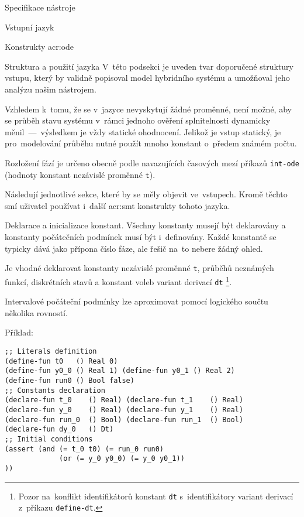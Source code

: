 \documentclass[thesis=M,czech]{FITthesis}[2012/06/26]
\newcommand{\acrlabel}[1]{acr:#1}
\newcommand{\acr}[1]{\acrshort{\acrlabel{#1}}}
\newcommand{\id}[1]{\texttt{#1}}
\begin{document}
\begin{section}{Specifikace nástroje}
\begin{subsection}{Vstupní jazyk}
\begin{subsubsection}{Konstrukty \acr{ode}}

\end{subsubsection} %


\begin{subsubsection}{Struktura a použití jazyka}
\label{sss:design:spec:ilang:struct}
V~této podsekci je uveden tvar doporučené struktury vstupu,
který by validně popisoval model hybridního systému
a umožňoval jeho analýzu našim nástrojem.

Vzhledem k~tomu, že se v~jazyce nevyskytují žádné proměnné,
není možné, aby se průběh stavu systému
v~rámci jednoho ověření splnitelnosti
dynamicky měnil~---~výsledkem je vždy statické ohodnocení.
Jelikož je vstup statický,
je pro~modelování průběhu nutné použít mnoho konstant
o~předem známém počtu.

Rozložení fází je určeno obecně
podle navazujících časových mezí příkazů \id{int-ode}
(hodnoty konstant nezávislé proměnné \id{t}).

Následují jednotlivé sekce,
které by se měly objevit ve~vstupech.
Kromě těchto smí uživatel používat
i~další \acr{smt} konstrukty tohoto jazyka.


\begin{paragraph}{Deklarace a inicializace konstant.}
\label{p:design:spec:ilang:struct:const}
Všechny konstanty musejí být deklarovány a konstanty
počátečních podmínek
musí být i~definovány.
Každé konstantě se typicky dává jako přípona číslo fáze,
ale řešič na~to nebere žádný ohled.

Je vhodné deklarovat konstanty
nezávislé proměnné \id{t},
průběhů neznámých funkcí, diskrétních stavů
a konstant voleb variant derivací \id{dt}%
\footnote{Pozor na~konflikt identifikátorů konstant \id{dt}
s~identifikátory variant derivací
z~příkazu \id{define\--dt}.}.

Intervalové počáteční podmínky lze aproximovat
pomocí logického součtu několika rovností.

Příklad:
\begin{Verbatim}[samepage=true]
;; Literals definition
(define-fun t0   () Real 0)
(define-fun y0_0 () Real 1) (define-fun y0_1 () Real 2)
(define-fun run0 () Bool false)
;; Constants declaration
(declare-fun t_0    () Real) (declare-fun t_1    () Real)
(declare-fun y_0    () Real) (declare-fun y_1    () Real)
(declare-fun run_0  () Bool) (declare-fun run_1  () Bool)
(declare-fun dy_0   () Dt)
;; Initial conditions
(assert (and (= t_0 t0) (= run_0 run0)
             (or (= y_0 y0_0) (= y_0 y0_1))
))
\end{Verbatim}
\end{paragraph} %


\end{subsubsection}
\end{subsection}
\end{section}
\end{document}
